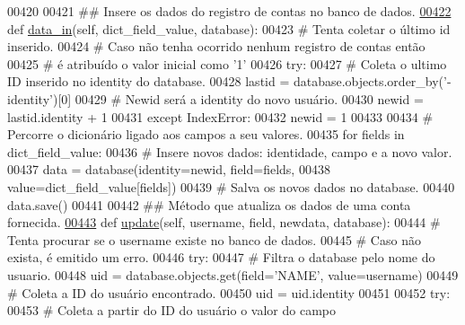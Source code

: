 \begin{DoxyCode}
00420 
00421     \textcolor{comment}{## Insere os dados do registro de contas no banco de dados.}
\hypertarget{AdmUnit_8py_source_l00422}{}\hyperlink{classAdm_1_1AdmUnit_1_1PersAdm_ab9b66eb770103a270de417a6b936ad21}{00422}     \textcolor{keyword}{def }\hyperlink{classAdm_1_1AdmUnit_1_1PersAdm_ab9b66eb770103a270de417a6b936ad21}{data\_in}(self, dict\_field\_value, database):
00423         \textcolor{comment}{# Tenta coletar o último id inserido.}
00424         \textcolor{comment}{# Caso não tenha ocorrido nenhum registro de contas então}
00425         \textcolor{comment}{# é atribuído o valor inicial como '1'}
00426         \textcolor{keywordflow}{try}:
00427             \textcolor{comment}{# Coleta o ultimo ID inserido no identity do database.}
00428             lastid = database.objects.order\_by(\textcolor{stringliteral}{'-identity'})[0]
00429             \textcolor{comment}{# Newid será a identity do novo usuário.}
00430             newid = lastid.identity + 1
00431         \textcolor{keywordflow}{except} IndexError:
00432             newid = 1
00433         
00434         \textcolor{comment}{# Percorre o dicionário ligado aos campos a seu valores.}
00435         \textcolor{keywordflow}{for} fields \textcolor{keywordflow}{in} dict\_field\_value:
00436             \textcolor{comment}{# Insere novos dados: identidade, campo e a novo valor.}
00437             data = database(identity=newid, field=fields,
00438                              value=dict\_field\_value[fields])
00439             \textcolor{comment}{# Salva os novos dados no database.}
00440             data.save()
00441 
00442     \textcolor{comment}{## Método que atualiza os dados de uma conta fornecida.}
\hypertarget{AdmUnit_8py_source_l00443}{}\hyperlink{classAdm_1_1AdmUnit_1_1PersAdm_a65d586fd8aaf0a9f2f7c609405721dff}{00443}     \textcolor{keyword}{def }\hyperlink{classAdm_1_1AdmUnit_1_1PersAdm_a65d586fd8aaf0a9f2f7c609405721dff}{update}(self, username, field, newdata, database): 
00444         \textcolor{comment}{# Tenta procurar se o username existe no banco de dados.}
00445         \textcolor{comment}{# Caso não exista, é emitido um erro.}
00446         \textcolor{keywordflow}{try}:
00447             \textcolor{comment}{# Filtra o database pelo nome do usuario.}
00448             uid = database.objects.get(field=\textcolor{stringliteral}{'NAME'}, value=username)
00449             \textcolor{comment}{# Coleta a ID do usuário encontrado.}
00450             uid = uid.identity
00451                 
00452             \textcolor{keywordflow}{try}:
00453                 \textcolor{comment}{# Coleta a partir do ID do usuário o valor do campo}

\end{DoxyCode}
